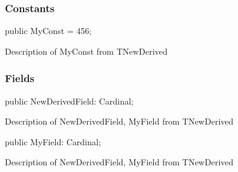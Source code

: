 \documentclass{report}
\newif\ifpdf
\begin{document}
\subsubsection*{\large{\textbf{Constants}}\normalsize\hspace{1ex}\hfill}
\begin{list}{}{
\setlength{\itemindent}{0cm}
\setlength{\listparindent}{0cm}
\setlength{\leftmargin}{\evensidemargin}
\addtolength{\leftmargin}{\tmplength}
\settowidth{\labelsep}{X}
\addtolength{\leftmargin}{\labelsep}
\setlength{\labelwidth}{\tmplength}
}
\label{ok_inherited_members_hide_ancestor.TNewDerived-MyConst}
\item[\textbf{MyConst}\hfill]
\ifpdf
\begin{flushleft}
\fi
\begin{ttfamily}
public MyConst = 456;\end{ttfamily}

\ifpdf
\end{flushleft}
\fi


\par Description of MyConst from TNewDerived\end{list}
\subsubsection*{\large{\textbf{Fields}}\normalsize\hspace{1ex}\hfill}
\begin{list}{}{
\setlength{\itemindent}{0cm}
\setlength{\listparindent}{0cm}
\setlength{\leftmargin}{\evensidemargin}
\addtolength{\leftmargin}{\tmplength}
\settowidth{\labelsep}{X}
\addtolength{\leftmargin}{\labelsep}
\setlength{\labelwidth}{\tmplength}
}
\label{ok_inherited_members_hide_ancestor.TNewDerived-NewDerivedField}
\item[\textbf{NewDerivedField}\hfill]
\ifpdf
\begin{flushleft}
\fi
\begin{ttfamily}
public NewDerivedField: Cardinal;\end{ttfamily}

\ifpdf
\end{flushleft}
\fi


\par Description of NewDerivedField, MyField from TNewDerived\label{ok_inherited_members_hide_ancestor.TNewDerived-MyField}
\item[\textbf{MyField}\hfill]
\ifpdf
\begin{flushleft}
\fi
\begin{ttfamily}
public MyField: Cardinal;\end{ttfamily}

\ifpdf
\end{flushleft}
\fi


\par Description of NewDerivedField, MyField from TNewDerived\end{list}
\end{document}
